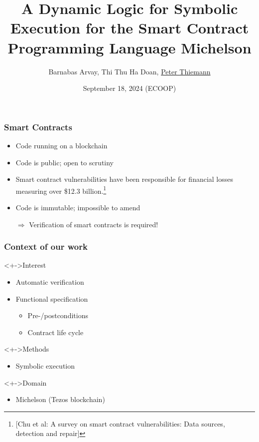 \documentclass[aspectratio=1610]{beamer}
\title[Dynamic Logic for Symbolic Execution]{A Dynamic Logic for Symbolic Execution for the Smart Contract Programming Language Michelson}
\author[Arvay, Doan, Thiemann]{Barnabas Arvay, Thi Thu Ha Doan, \underline{Peter Thiemann}}
\institute[]{University of Freiburg}
\date{September 18, 2024 (ECOOP)}
\begin{document}
\begin{frame}
  \titlepage
\end{frame}

\begin{frame}
  \frametitle{Smart Contracts}
  \begin{itemize}
  \item Code running on a blockchain
  \item Code is public; open to scrutiny
  \item Smart contract vulnerabilities have been responsible for financial losses measuring over \$12.3 billion.\footnote{
      [Chu et al: A survey on smart contract vulnerabilities: Data sources, detection and repair]}
  \item Code is immutable; impossible to amend
  \item[$\Rightarrow$] Verification of smart contracts is required!
  \end{itemize}
\end{frame}
\begin{frame}
  \frametitle{Context of our work}
  \begin{block}<+->{Interest}
  \begin{itemize}
  \item Automatic verification
  \item Functional specification
    \begin{itemize}
    \item Pre-/postconditions
    \item Contract life cycle
    \end{itemize}
  \end{itemize}
\end{block}
\begin{block}<+->{Methods}
  \begin{itemize}
  \item Symbolic execution
  \end{itemize}
\end{block}
\begin{block}<+->{Domain}
  \begin{itemize}
  \item Michelson (Tezos blockchain)
  \end{itemize}
\end{block}
\end{frame}
\end{document}
